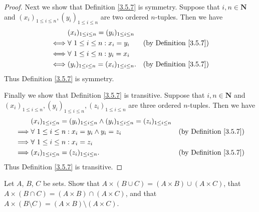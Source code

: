 \begin{proof}
    Next we show that Definition \ref{3.5.7} is symmetry.
    Suppose that \(i, n \in \mathbf{N}\) and \((x_i)_{1 \leq i \leq n}, (y_i)_{1 \leq i \leq n}\) are two ordered \(n\)-tuples.
    Then we have
    \begin{align*}
             & (x_i)_{1 \leq i \leq n} = (y_i)_{1 \leq i \leq n}                                       \\
        \iff & \forall\ 1 \leq i \leq n : x_i = y_i               & \text{(by Definition \ref{3.5.7})} \\
        \iff & \forall\ 1 \leq i \leq n : y_i = x_i                                                    \\
        \iff & (y_i)_{1 \leq i \leq n} = (x_i)_{1 \leq i \leq n}. & \text{(by Definition \ref{3.5.7})}
    \end{align*}
    Thus Definition \ref{3.5.7} is symmetry.

    Finally we show that Definition \ref{3.5.7} is transitive.
    Suppose that \(i, n \in \mathbf{N}\) and \((x_i)_{1 \leq i \leq n}, (y_i)_{1 \leq i \leq n}, (z_i)_{1 \leq i \leq n}\) are three ordered \(n\)-tuples.
    Then we have
    \begin{align*}
                 & (x_i)_{1 \leq i \leq n} = (y_i)_{1 \leq i \leq n} \land (y_i)_{1 \leq i \leq n} = (z_i)_{1 \leq i \leq n}                                      \\
        \implies & \forall\ 1 \leq i \leq n : x_i = y_i \land y_i = z_i                                                      & \text{(by Definition \ref{3.5.7})} \\
        \implies & \forall\ 1 \leq i \leq n : x_i = z_i                                                                                                           \\
        \implies & (x_i)_{1 \leq i \leq n} = (z_i)_{1 \leq i \leq n}.                                                        & \text{(by Definition \ref{3.5.7})}
    \end{align*}
    Thus Definition \ref{3.5.7} is transitive.
\end{proof}

\begin{exercise}\label{ex 3.5.4}
    Let \(A\), \(B\), \(C\) be sets.
    Show that \(A \times (B \cup C) = (A \times B) \cup (A \times C)\), that \(A \times (B \cap C) = (A \times B) \cap (A \times C)\), and that \(A \times (B \setminus C) = (A \times B) \setminus (A \times C)\).
\end{exercise}

